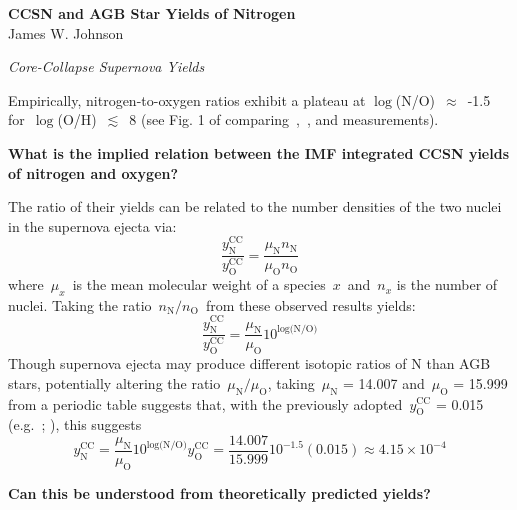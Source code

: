\documentclass[12pt]{report}
\newcommand\twolineskip{\par\noindent\null\par\noindent}
\newcommand{\ddfrac}[2]{\frac{\displaystyle #1}{\displaystyle #2}}
\begin{document}
 
\begin{center} 
\textbf{{\Large CCSN and AGB Star Yields of Nitrogen}} \\ 
James W. Johnson 
\end{center} 

\noindent 
{\Large \textit{Core-Collapse Supernova Yields}} 
\par\noindent 
Empirically, nitrogen-to-oxygen ratios exhibit a plateau at 
$\log$(N/O)~$\approx$~-1.5 for~$\log$(O/H)~$\lesssim$~8 (see Fig. 1 of 
\citealp{Vincenzo2016} comparing~\citealp{Berg2012},~\citealp*{Izotov2012}, and 
\citealp{James2015} measurements). 
\twolineskip 
\textbf{What is the implied relation between the IMF integrated CCSN yields of 
nitrogen and oxygen?} 
\par\noindent 
The ratio of their yields can be related to the number densities of the two 
nuclei in the supernova ejecta via: 
\begin{equation} 
\ddfrac{y_\text{N}^\text{CC}}{y_\text{O}^\text{CC}} = 
\ddfrac{\mu_\text{N}n_\text{N}}{\mu_\text{O}n_\text{O}} 
\end{equation} 
where~$\mu_x$~is the mean molecular weight of a species~$x$~and~$n_x$ is the 
number of nuclei. Taking the ratio~$n_\text{N}/n_\text{O}$~from these observed 
results yields: 
\begin{equation} 
\ddfrac{y_\text{N}^\text{CC}}{y_\text{O}^\text{CC}} = 
\ddfrac{\mu_\text{N}}{\mu_\text{O}}10^{\log\text{(N/O)}} 
\end{equation} 
Though supernova ejecta may produce different isotopic ratios of N than AGB 
stars, potentially  
altering the ratio~$\mu_\text{N}/\mu_\text{O}$, taking~$\mu_\text{N}$ = 14.007 
and~$\mu_\text{O}$ = 15.999 from a periodic table suggests that, with the 
previously adopted~$y_\text{O}^\text{CC}$ = 0.015 (e.g.~\citealp*{Weinberg2017}; 
\citealp{Johnson2020}), this suggests 
\begin{equation} 
y_\text{N}^\text{CC} = \ddfrac{\mu_\text{N}}{\mu_\text{O}}10^{\log\text{(N/O)}} 
y_\text{O}^\text{CC} = \ddfrac{14.007}{15.999}10^{-1.5}(0.015) \approx 
4.15\times10^{-4} 
\end{equation} 
\twolineskip 
\textbf{Can this be understood from theoretically predicted yields?} 
\end{document}
